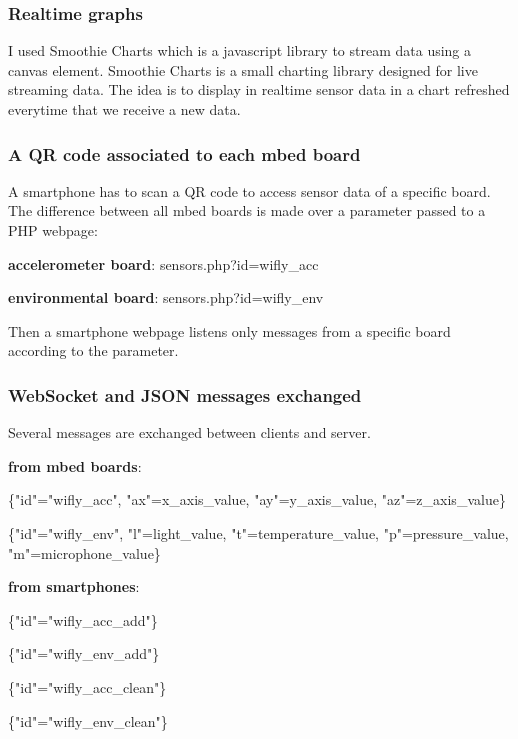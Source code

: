 \documentclass[pdftex,10pt,a4paper]{report}
\newenvironment{packed_item}{
\begin{itemize}
  \setlength{\itemsep}{1pt}
  \setlength{\parskip}{0pt}
  \setlength{\parsep}{0pt}
}{\end{itemize}}
\begin{document}
\subsubsection{Realtime graphs}
I used Smoothie Charts which is a javascript library to stream data using a canvas element. Smoothie Charts is a small charting library designed for live streaming data. The idea is to display in realtime sensor data in a chart refreshed everytime that we receive a new data.

\subsubsection{A QR code associated to each mbed board}
A smartphone has to scan a QR code to access sensor data of a specific board. The difference between all mbed boards is made over a parameter passed to a PHP webpage:
\begin{packed_item}
	\item \textbf{accelerometer board}: sensors.php?id=wifly\_acc
	\item \textbf{environmental board}: sensors.php?id=wifly\_env
\end{packed_item}

Then a smartphone webpage listens only messages from a specific board according to the parameter. 

\subsubsection{WebSocket and JSON messages exchanged}
Several messages are exchanged between clients and server. 
\begin{packed_item}
	\item \textbf{from mbed boards}:
		\begin{center}
		\begin{packed_item}
				\item \{"id"="wifly\_acc", "ax"=x\_axis\_value, "ay"=y\_axis\_value, "az"=z\_axis\_value\} \\
				\item \{"id"="wifly\_env", "l"=light\_value, "t"=temperature\_value, "p"=pressure\_value, "m"=microphone\_value\}
		\end{packed_item}
		\end{center}
	\item \textbf{from smartphones}:
		\begin{center}
		\begin{packed_item}
				\item \{"id"="wifly\_acc\_add"\} \\
				\item \{"id"="wifly\_env\_add"\} \\
				\item \{"id"="wifly\_acc\_clean"\} \\
				\item \{"id"="wifly\_env\_clean"\}
		\end{packed_item}
		\end{center}
		
\end{packed_item}
\end{document}
